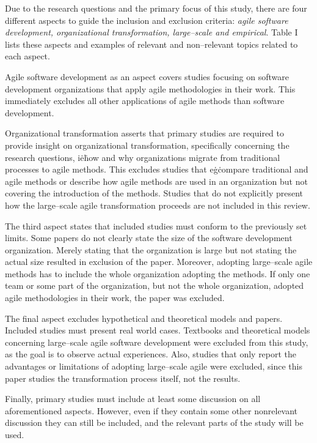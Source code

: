 Due to the research questions and the primary focus of this study, there are
four different aspects to guide the inclusion and exclusion criteria:
\textit{agile software development, organizational transformation, large–scale
and empirical}. Table I lists these aspects and examples of relevant and
non–relevant topics related to each aspect.


\vspace{1.5cm}

Agile software development as an aspect covers studies focusing on
software development organizations that apply agile methodologies in
their work. This immediately excludes all other applications of agile
methods than software development.

Organizational transformation asserts that primary studies are required
to provide insight on organizational transformation, specifically
concerning the research questions, i\.e\. how and why organizations
migrate from traditional processes to agile methods. This excludes
studies that e\.g\. compare traditional and agile methods or describe
how agile methods are used in an organization but not covering the
introduction of the methods. Studies that do not explicitly present how
the large–scale agile transformation proceeds are not included in this
review.

The third aspect states that included studies must conform to the
previously set limits. Some papers do not clearly state the size of the
software development organization. Merely stating that the organization
is large but not stating the actual size resulted in exclusion of the
paper. Moreover, adopting large–scale agile methods has to include the
whole organization adopting the methods. If only one team or some part
of the organization, but not the whole organization, adopted agile
methodologies in their work, the paper was excluded.

The final aspect excludes hypothetical and theoretical models and
papers. Included studies must present real world cases. Textbooks
and theoretical models concerning large–scale agile software
development were excluded from this study, as the goal is to observe
actual experiences. Also, studies that only report the advantages or
limitations of adopting large–scale agile were excluded, since this
paper studies the transformation process itself, not the results.

Finally, primary studies must include at least some discussion on
all aforementioned aspects. However, even if they contain some other
nonrelevant discussion they can still be included, and the relevant
parts of the study will be used.
